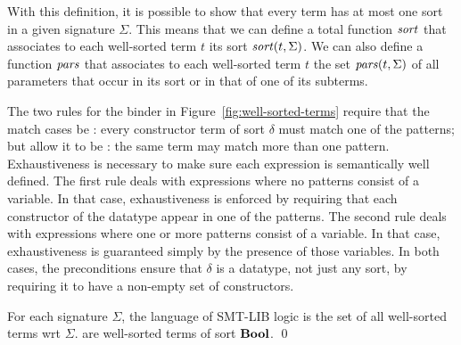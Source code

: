 With this definition, it is possible to show that every term has at
most one sort in a given signature $\Sigma$.
This means that we can define a total function $\mathit{sort}$ that associates 
to each well-sorted term $t$ its sort $\mathit{sort}(t, \Sigma)$.
We can also define a function $\mathit{pars}$ that associates to each well-sorted term $t$
the set $\mathit{pars}(t, \Sigma)$ of all parameters that occur in its sort or in that 
of one of its subterms.

\begin{remark}
The two rules for the  binder in Figure~\ref{fig:well-sorted-terms} 
require that the match cases be :
every constructor term of sort $\delta$ must match one of the patterns;
but allow it to be :
the same term may match more than one pattern.
Exhaustiveness is necessary to make sure each  expression is
semantically well defined.
The first rule deals with  expressions where no patterns consist 
of a variable.
In that case, exhaustiveness is enforced by requiring that each constructor
of the datatype appear in one of the patterns.
The second rule deals with  expressions where one or more patterns 
consist of a variable.
In that case, exhaustiveness is guaranteed simply by the presence 
of those variables.
In both cases, the preconditions ensure that $\delta$ is a datatype, 
not just any sort, by requiring it to have a non-empty set of constructors.
\end{remark}


\begin{definition}
For each signature $\Sigma$,
the language of SMT-LIB logic is the set of all well-sorted terms
wrt $\Sigma$.
 are well-sorted terms of sort $\textbf{Bool}$.
\qed
\end{definition}

